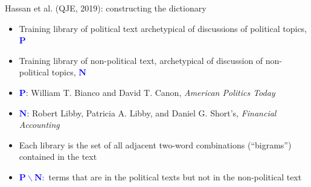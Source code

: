 \documentclass[english]{beamer}
\begin{document}
\begin{frame}{Hassan et al. (QJE, 2019): constructing the dictionary}
\begin{itemize}
\setlength{\itemsep}{0.9em}
\item Training library of political text archetypical of discussions of political topics, \textcolor{blue}{$\mathbf{P}$}
\item Training library of non-political text, archetypical of discussion of non-political topics, \textcolor{blue}{$\mathbf{N}$}
\pause
\item \textcolor{blue}{$\mathbf{P}$}: William T. Bianco and David T. Canon, \textit{American Politics Today}
\item \textcolor{blue}{$\mathbf{N}$}: Robert Libby, Patricia A. Libby, and Daniel G. Short's, \textit{Financial Accounting}
\pause
\item Each library is the set of all adjacent two-word combinations (``bigrams'') contained in the text
\item \textcolor{blue}{$\boldsymbol{P}\backslash \boldsymbol{N}:$} terms that are in the political texts but not in the non-political text
\end{itemize}
\end{frame}
\end{document}
